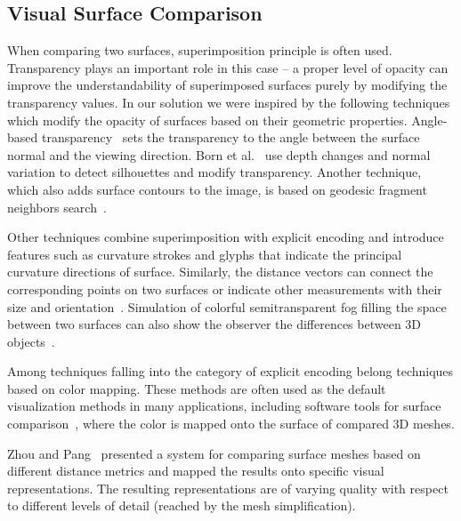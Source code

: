 \documentclass[final,5p,times]{elsarticle}
\begin{document}
\subsection{Visual Surface Comparison}
When comparing two surfaces, superimposition principle is often used.
Transparency plays an important role in this case -- a proper level of opacity can improve the understandability of superimposed surfaces purely by modifying the transparency values. 
In our solution we were inspired by the following techniques which modify the opacity of surfaces based on their geometric properties. 
Angle-based transparency~\cite{hummel2010iris} sets the transparency to the angle between the surface normal and the viewing direction. 
Born et al.~\cite{born2009illustrative} use depth changes and normal variation to detect silhouettes and modify transparency. 
Another technique, which also adds surface contours to the image, is based on geodesic fragment neighbors search~\cite{carnecky2013smart}. 

\begin{sloppypar}
Other techniques \cite{interrante1997conveying,diewald2000anisotropic,weigle2005visualizing} combine superimposition with explicit encoding and introduce features such as curvature strokes and glyphs that indicate the principal curvature directions of surface.
Similarly, the distance vectors can connect the corresponding points on two surfaces or indicate other measurements with their size and orientation~\cite{busking2011image}. 
Simulation of colorful semitransparent fog filling the space between two surfaces can also show the observer the differences between 3D objects~\cite{busking2011image}.
\end{sloppypar}

\begin{sloppypar}
Among techniques falling into the category of explicit encoding belong techniques based on color mapping. 
These methods are often used as the default visualization methods in many applications, including software tools for surface comparison~\cite{CCompare,ymca}, where the color is mapped onto the surface of compared 3D meshes.
\end{sloppypar} 

Zhou and Pang~\cite{Zhou2001} presented a system for comparing surface meshes based on different distance metrics and mapped the results onto specific visual representations.
The resulting representations are of varying quality with respect to different levels of detail (reached by the mesh simplification).
\end{document}
